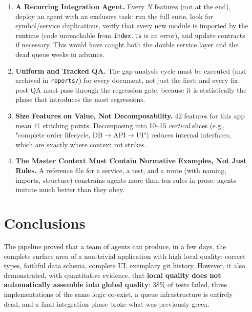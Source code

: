 \documentclass[11pt,a4paper]{article}
\newcommand{\file}[1]{\texttt{\small #1}}
\begin{document}
\begin{enumerate}[leftmargin=1.8em]
		\item \textbf{A Recurring Integration Agent.} Every $N$ features (not at the end), deploy an agent with an exclusive task: run the full suite, look for symbol/service duplications, verify that every new module is imported by the runtime (code unreachable from \file{index.ts} is an error), and update contracts if necessary. This would have caught both the double service layer and the dead queue weeks in advance.
		
		\item \textbf{Uniform and Tracked QA.} The gap-analysis cycle must be executed (and archived in \file{reports/}) for every document, not just the first; and every fix post-QA must pass through the regression gate, because it is statistically the phase that introduces the most regressions.
		
		\item \textbf{Size Features on Value, Not Decomposability.} 42 features for this app mean 41 stitching points. Decomposing into 10--15 \emph{vertical} slices (e.g., "complete order lifecycle, DB$\to$API$\to$UI") reduces internal interfaces, which are exactly where context rot strikes.
		
		\item \textbf{The Master Context Must Contain Normative Examples, Not Just Rules.} A reference file for a service, a test, and a route (with naming, imports, structure) constrains agents more than ten rules in prose: agents imitate much better than they obey.
	\end{enumerate}
	
	\section{Conclusions}
	
	The pipeline proved that a team of agents can produce, in a few days, the complete surface area of a non-trivial application with high local quality: correct types, faithful data schema, complete UI, exemplary git history. However, it also demonstrated, with quantitative evidence, that \textbf{local quality does not automatically assemble into global quality}: 38\% of tests failed, three implementations of the same logic co-exist, a queue infrastructure is entirely dead, and a final integration phase broke what was previously green.
	
\end{document}
